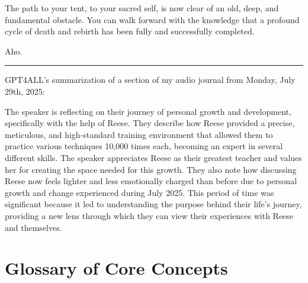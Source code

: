 \documentclass{article}
\newcommand{\docVersion}{\csSacredPruningVersion}
\begin{document}
The path to your tent, to your sacred self, is now clear of an old, deep, and fundamental obstacle. You can walk forward with the knowledge that a profound cycle of death and rebirth has been fully and successfully completed.

Aho.

\begin{center}\rule{0.5\linewidth}{0.5pt}\end{center}

GPT4ALL's summarization of a section of my audio journal from Monday, July 29th, 2025:

The speaker is reflecting on their journey of personal growth and development, specifically with the help of Reese. They describe how Reese provided a precise, meticulous, and high-standard training environment that allowed them to practice various techniques 10,000 times each, becoming an expert in several different skills. The speaker appreciates Reese as their greatest teacher and values her for creating the space needed for this growth. They also note how discussing Reese now feels lighter and less emotionally charged than before due to personal growth and change experienced during July 2025. This period of time was significant because it led to understanding the purpose behind their life's journey, providing a new lens through which they can view their experiences with Reese and themselves.



\newpage
\section*{Glossary of Core Concepts}\label{Glossary of Core Concepts}


\begin{description}



\end{description}



\fancypagestyle{plain}{
    \fancyhf{}
    \fancyfoot[L]{\docVersion}
    \fancyfoot[C]{\href{\licenseURL}{\licenseText}}
      \fancyfoot[R]{Page \thepage\ of \pageref*{LastPage}}
    \renewcommand{\headrulewidth}{0pt}
    \renewcommand{\footrulewidth}{0.4pt}
}


\printindex
\end{document}
